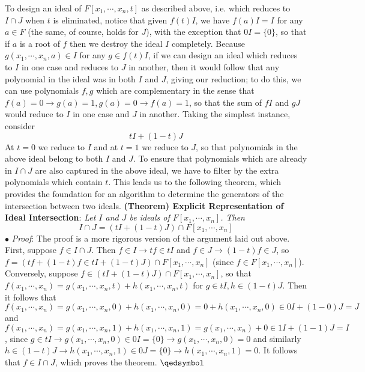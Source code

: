 \documentclass{article}
\newcommand*{\tb}{\textbf}
\newcommand*{\ti}{\textit}
\newcommand*{\n}{\newline}
\newcommand*{\nn}{\newline \newline}
\newcommand*{\Fx}{\ensuremath{F[x_1, \cdots, x_n]}}
\begin{document}
\n
To design an ideal of $ F[x_1, \cdots, x_n, t] $ as described above, i.e. which reduces to $ I \cap J $ when $ t $ is eliminated, notice that given $ f(t) I $, we have $ f(a) I = I $ for any $ a \in F $ (the same, of course, holds for $ J $), with the exception that $ 0 I = \{ 0 \} $, so that if $ a $ is a root of $ f $ then we destroy the ideal $ I $ completely. Because $ g(x_1, \cdots, x_n, a) \in I $ for any $ g \in f(t) I $, if we can design an ideal which reduces to $ I $ in one case and reduces to $ J $ in another, then it would follow that any polynomial in the ideal was in both $ I $ and $ J $, giving our reduction; to do this, we can use polynomials $ f, g $ which are complementary in the sense that $ f(a) = 0 \rightarrow g(a) = 1, g(a) = 0 \rightarrow f(a) = 1 $, so that the sum of $ f I $ and $ g J $ would reduce to $ I $ in one case and $ J $ in another. Taking the simplest instance, consider
$$ t I + (1 - t) J $$
At $ t = 0 $ we reduce to $ I $ and at $ t = 1 $ we reduce to $ J $, so that polynomials in the above ideal belong to both $ I $ and $ J $. To ensure that polynomials which are already in $ I \cap J $ are also captured in the above ideal, we have to filter by the extra polynomials which contain $ t $. This leads us to the following theorem, which provides the foundation for an algorithm to determine the generators of the intersection between two ideals.
\nn
\tb{(Theorem) Explicit Representation of Ideal Intersection}: \ti{Let $ I $ and $ J $ be ideals of $ \Fx $. Then}
$$ I \cap J = (t I + (1 - t) J) \cap \Fx $$
\indent $ \bullet $ \ti{Proof}: The proof is a more rigorous version of the argument laid out above. First, suppose $ f \in I \cap J $. Then $ f \in I \rightarrow t f \in t I $ and $ f \in J \rightarrow (1 - t) f \in J $, so $ f = (t f + (1 - t) f \in t I + (1 - t) J) \cap \Fx $ (since $ f \in \Fx $). Conversely, suppose $ f \in (t I + (1 - t) J) \cap \Fx $, so that $ f(x_1, \cdots, x_n) = g(x_1, \cdots, x_n, t) + h(x_1, \cdots, x_n, t) $ for $ g \in t I, h \in (1 - t) J $. Then it follows that $ f(x_1, \cdots, x_n) = g(x_1, \cdots, x_n, 0) + h(x_1, \cdots, x_n, 0) = 0 + h(x_1, \cdots, x_n, 0) \in 0 I + (1 - 0) J = J $ and $ f(x_1, \cdots, x_n) = g(x_1, \cdots, x_n, 1) + h(x_1, \cdots, x_n, 1) = g(x_1, \cdots, x_n) + 0 \in 1 I + (1 - 1) J = I $, since $ g \in t I \rightarrow g(x_1, \cdots, x_n, 0) \in 0 I = \{ 0 \} \rightarrow g(x_1, \cdots, x_n, 0) = 0 $ and similarly $ h \in (1 - t) J \rightarrow h(x_1, \cdots, x_n, 1) \in 0 J = \{ 0 \} \rightarrow h(x_1, \cdots, x_n, 1) = 0 $. It follows that $ f \in I \cap J $, which proves the theorem. $ \qedsymbol $
\end{document}
